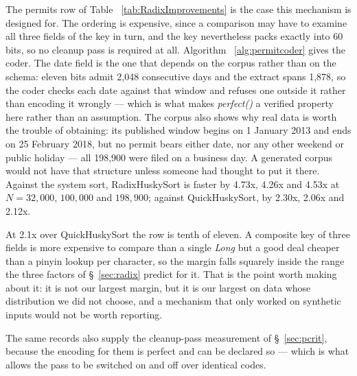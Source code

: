 \documentclass[twoside,leqno,twocolumn]{article}
\begin{document}
The permits row of Table ~\ref{tab:RadixImprovements} is the case this mechanism is designed for.
The ordering is expensive, since a comparison may have to examine all three fields of the key in turn,
and the key nevertheless packs exactly into 60 bits, so no cleanup pass is required at all.
Algorithm ~\ref{alg:permitcoder} gives the coder.
The date field is the one that depends on the corpus rather than on the schema: eleven bits admit 2,048
consecutive days and the extract spans 1,878, so the coder checks each date against that window and
refuses one outside it rather than encoding it wrongly ---
which is what makes \textit{perfect()} a verified property here rather than an assumption.
The corpus also shows why real data is worth the trouble of obtaining: its published window begins on
1 January 2013 and ends on 25 February 2018, but no permit bears either date, nor any other weekend or
public holiday --- all 198,900 were filed on a business day.
A generated corpus would not have that structure unless someone had thought to put it there.
Against the system sort, RadixHuskySort is faster by 4.73x, 4.26x and 4.53x at $N = 32{,}000$,
$100{,}000$ and $198{,}900$; against QuickHuskySort, by 2.30x, 2.06x and 2.12x.

At 2.1x over QuickHuskySort the row is tenth of eleven.
A composite key of three fields is more expensive to compare than a single \textit{Long} but a good
deal cheaper than a pinyin lookup per character, so the margin falls squarely inside the range the
three factors of \S~\ref{sec:radix} predict for it.
That is the point worth making about it: it is not our largest margin, but it is our largest on data
whose distribution we did not choose, and a mechanism that only worked on synthetic inputs would not be
worth reporting.

The same records also supply the cleanup-pass measurement of \S~\ref{sec:pcrit},
because the encoding for them is perfect and can be declared so ---
which is what allows the pass to be switched on and off over identical codes.
\end{document}
